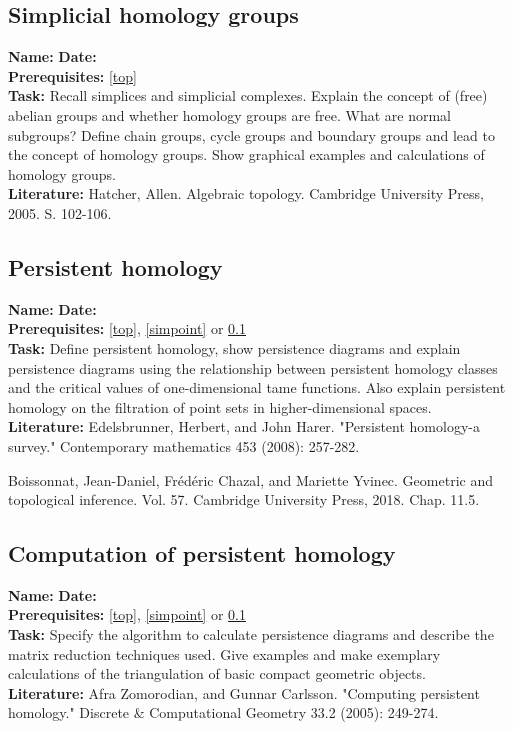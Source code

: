 \documentclass{article}
\begin{document}
\subsection{Simplicial homology groups}
\label{simsing}
\textbf{Name:}  \hspace{4cm} \textbf{Date:} \\
\textbf{Prerequisites:} \ref{top}\\
\textbf{Task:} Recall simplices and simplicial complexes. Explain the concept of (free) abelian groups and whether homology groups are free. What are normal subgroups? Define chain groups, cycle groups and boundary groups and lead to the concept of homology groups. Show graphical examples and calculations of homology groups.\\
\textbf{Literature:}
Hatcher, Allen. Algebraic topology. Cambridge University Press, 2005. S. 102-106.

\subsection{Persistent homology}
\label{pershom}
\textbf{Name:}  \hspace{4cm} \textbf{Date:} \\
\textbf{Prerequisites:} \ref{top}, \ref{simpoint} or \ref{simsing}\\
\textbf{Task:} Define persistent homology, show persistence diagrams and explain persistence diagrams using the relationship between persistent homology classes and the critical values of one-dimensional tame functions. Also explain persistent homology on the filtration of point sets in higher-dimensional spaces.\\
\textbf{Literature:} Edelsbrunner, Herbert, and John Harer. "Persistent homology-a survey." Contemporary mathematics 453 (2008): 257-282.

Boissonnat, Jean-Daniel, Frédéric Chazal, and Mariette Yvinec. Geometric and topological inference. Vol. 57. Cambridge University Press, 2018. Chap. 11.5.

\subsection{Computation of persistent homology}
\label{pershomcomp}
\textbf{Name:} \hspace{4cm} \textbf{Date:} \\
\textbf{Prerequisites:} \ref{top}, \ref{simpoint} or \ref{simsing}\\
\textbf{Task:} Specify the algorithm to calculate persistence diagrams and describe the matrix reduction techniques used. Give examples and make exemplary calculations of the triangulation of basic compact geometric objects.\\
\textbf{Literature:}
Afra Zomorodian, and Gunnar Carlsson. "Computing persistent homology." Discrete \& Computational Geometry 33.2 (2005): 249-274.
\end{document}
